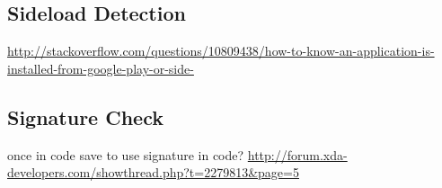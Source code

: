 \subsection{Sideload Detection}\label{subsection:tampering-sideload}
\url{http://stackoverflow.com/questions/10809438/how-to-know-an-application-is-installed-from-google-play-or-side-}
\subsection{Signature Check}\label{subsection:tampering-signature}
once in code \newline
save to use signature in code?\newline
\url{http://forum.xda-developers.com/showthread.php?t=2279813&page=5}\newline


